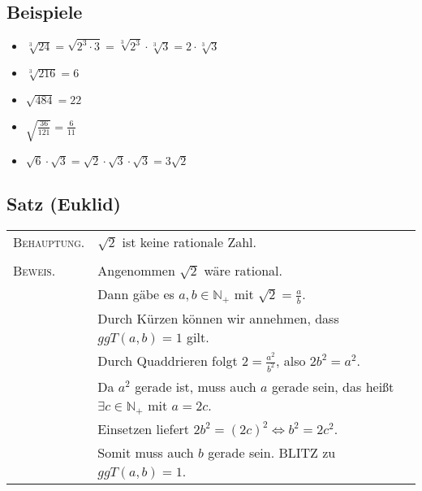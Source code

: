 	
\subsection{Beispiele}

	\begin{itemize}
	\item $\sqrt[3]{24}=\sqrt{2^3\cdot 3}=\sqrt[3]{2^3}\cdot \sqrt[3]{3}=2\cdot \sqrt[3]{3}$
	\item $\sqrt[3]{216}=6$	
	\item $\sqrt{484}=22$
	\item $\sqrt{\frac{36}{121}}=\frac{6}{11}$
	\item $\sqrt{6}\cdot \sqrt{3}= \sqrt{2}\cdot\sqrt{3}\cdot\sqrt{3}=3\sqrt{2}$	
	
	\end{itemize}
	
	
\subsection[Irrationalitätsbeweis von $\sqrt{2}$ nach Euklid]{Satz (Euklid)}
	\begin{tabular}{ll}
	
	
	\textsc{Behauptung.} 	& $\sqrt{2}$ ist keine rationale Zahl.\\
							&									\\
	\textsc{Beweis.} 		& Angenommen $\sqrt{2}$ wäre rational.\\
							& Dann gäbe es $a,b \in \mathbb{N_+}$ mit $\sqrt{2}=\frac{a}{b}$. \\
							& Durch Kürzen können wir annehmen, dass $ggT(a,b)=1$ gilt. \\
							& Durch Quaddrieren folgt $2= \frac{a^2}{b^2}$, also $2b^2=a^2$. \\
							& Da $a^2$ gerade ist, muss auch $a$ gerade sein, 
							das heißt $\exists c \in \mathbb{N_+}$ mit $a=2c$. \\
							& Einsetzen liefert $2b^2=(2c)^2 \Leftrightarrow b^2=2c^2$. \\
							& Somit muss auch $b$ gerade sein. BLITZ zu $ggT(a,b)=1$.
	\end{tabular}
	